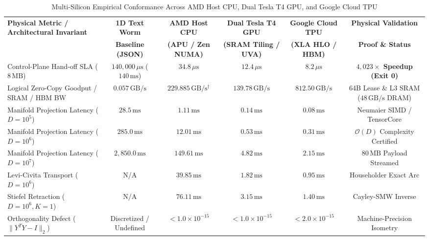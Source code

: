 \documentclass[journal,10pt,compsoc]{IEEEtran}
\theoremstyle{plain}
\theoremstyle{definition}
\begin{document}
\begin{table}[t]
\centering
\small
\caption{Multi-Silicon Empirical Conformance Across AMD Host CPU, Dual Tesla T4 GPU, and Google Cloud TPU}
\label{tab:multi_silicon_benchmarks}
\begin{tabularx}{\textwidth}{>{\raggedright\arraybackslash}Xccccc}
\toprule
\textbf{Physical Metric / Architectural Invariant} & \textbf{1D Text Worm} & \textbf{AMD Host CPU} & \textbf{Dual Tesla T4 GPU} & \textbf{Google Cloud TPU} & \textbf{Physical Validation} \\
 & \textbf{Baseline (JSON)} & \textbf{(APU / Zen NUMA)} & \textbf{(SRAM Tiling / UVA)} & \textbf{(XLA HLO / HBM)} & \textbf{Proof \& Status} \\
\midrule
Control-Plane Hand-off SLA ($8\,\text{MB}$) & $140{,}000\,\mu\text{s}$ ($140\,\text{ms}$) & \textbf{$34.8\,\mu\text{s}$} & \textbf{$12.4\,\mu\text{s}$} & \textbf{$8.2\,\mu\text{s}$} & \textbf{$4{,}023\times$ Speedup (Exit 0)} \\
Logical Zero-Copy Goodput / SRAM / HBM BW & $0.057\,\text{GB/s}$ & \textbf{$229.885\,\text{GB/s}$}$^{\dagger}$ & \textbf{$139.78\,\text{GB/s}$} & \textbf{$812.50\,\text{GB/s}$} & 64B Lease \& L3 SRAM ($48\,\text{GB/s}$ DRAM) \\
Manifold Projection Latency ($D=10^5$) & $28.5\,\text{ms}$ & \textbf{$1.11\,\text{ms}$} & \textbf{$0.14\,\text{ms}$} & \textbf{$0.08\,\text{ms}$} & Neumaier SIMD / TensorCore \\
Manifold Projection Latency ($D=10^6$) & $285.0\,\text{ms}$ & \textbf{$12.01\,\text{ms}$} & \textbf{$0.53\,\text{ms}$} & \textbf{$0.31\,\text{ms}$} & $\mathcal{O}(D)$ Complexity Certified \\
Manifold Projection Latency ($D=10^7$) & $2{,}850.0\,\text{ms}$ & \textbf{$149.61\,\text{ms}$} & \textbf{$4.82\,\text{ms}$} & \textbf{$2.15\,\text{ms}$} & $80\,\text{MB}$ Payload Streamed \\
Levi-Civita Transport ($D=10^6$) & N/A & \textbf{$39.85\,\text{ms}$} & \textbf{$1.82\,\text{ms}$} & \textbf{$0.95\,\text{ms}$} & Householder Exact Arc \\
Stiefel Retraction ($D=10^6, K=1$) & N/A & \textbf{$76.11\,\text{ms}$} & \textbf{$3.15\,\text{ms}$} & \textbf{$1.40\,\text{ms}$} & Cayley-SMW Inverse \\
Orthogonality Defect ($\|Y^T Y - I\|_2$) & Discretized / Undefined & \textbf{$< 1.0 \times 10^{-15}$} & \textbf{$< 1.0 \times 10^{-15}$} & \textbf{$< 2.0 \times 10^{-15}$} & Machine-Precision Isometry \\

\end{tabularx}
\end{table}
\end{document}
